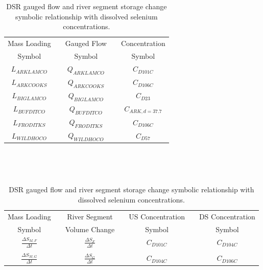 \begin{table}[htbp]
	\centering
	\caption[DSR gauged flow and river segment storage change symbolic relationship with dissolved selenium concentrations. ]{DSR gauged flow and river segment storage change symbolic relationship with dissolved selenium concentrations.}
	\label{tab:concFlowStoreRelationship_DSR}
	\begin{subtable}{\textwidth}
		\centering
		\begin{tabular}{c c c c c} 
			\toprule  
			Mass Loading & & Gauged Flow & & Concentration \\
			Symbol & & Symbol & & Symbol\\
			\toprule 
			$ L_{ARKLAMCO} $ & & $ Q_{ARKLAMCO} $ & & $ C_{D101C} $\\
			$ L_{ARKCOOKS} $ & & $ Q_{ARKCOOKS} $ & & $ C_{D106C} $\\
			$ L_{BIGLAMCO} $ & & $ Q_{BIGLAMCO} $ & & $ C_{D23} $\\
			$ L_{BUFDITCO} $ & & $ Q_{BUFDITCO} $ & & $ C_{ARK,d=37.7} $\\
			$ L_{FRODITKS} $ & & $ Q_{FRODITKS} $ & & $ C_{D106C} $\\
			$ L_{WILDHOCO} $ & & $ Q_{WILDHOCO} $ & & $ C_{D57} $\\
			\bottomrule
		\end{tabular} \\
	\end{subtable}\\
	\tablevspace
	\begin{subtable}{\textwidth}
		\centering
		\begin{tabular}{c c c c c c c} 
			\toprule  
			Mass Loading & & River Segment & & US Concentration & & DS Concentration\\
			Symbol & & Volume Change & & Symbol & & Symbol\\
			\toprule 
			$ \displaystyle \frac{\Delta S_{M,F}}{\Delta t} $ & & $ \displaystyle \frac{\Delta S_F}{\Delta t} $ & & $ C_{D101C} $ & & $ C_{D104C} $\\ \\
			$ \displaystyle \frac{\Delta S_{M,G}}{\Delta t} $ & & $ \displaystyle \frac{\Delta S_G}{\Delta t} $ & & $ C_{D104C} $ & & $ C_{D106C} $\\
			\bottomrule
		\end{tabular} \\
	\end{subtable}\\
\end{table}

